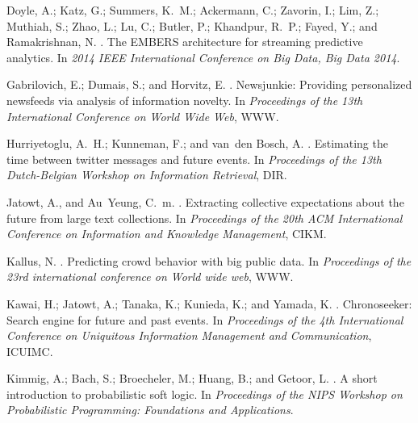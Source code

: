\documentclass[letterpaper]{article}
\begin{document}
\begin{thebibliography}{}
Doyle, A.; Katz, G.; Summers, K.~M.; Ackermann, C.; Zavorin, I.; Lim, Z.;
  Muthiah, S.; Zhao, L.; Lu, C.; Butler, P.; Khandpur, R.~P.; Fayed, Y.; and
  Ramakrishnan, N.
.
\newblock The {EMBERS} architecture for streaming predictive analytics.
\newblock In {\em 2014 {IEEE} International Conference on Big Data, Big Data
  2014}.

Gabrilovich, E.; Dumais, S.; and Horvitz, E.
.
\newblock Newsjunkie: Providing personalized newsfeeds via analysis of
  information novelty.
\newblock In {\em Proceedings of the 13th International Conference on World
  Wide Web}, WWW.

Hurriyetoglu, A.~H.; Kunneman, F.; and van~den Bosch, A.
.
\newblock Estimating the time between twitter messages and future events.
\newblock In {\em Proceedings of the 13th Dutch-Belgian Workshop on Information
  Retrieval}, DIR.

Jatowt, A., and Au~Yeung, C.~m.
.
\newblock Extracting collective expectations about the future from large text
  collections.
\newblock In {\em Proceedings of the 20th ACM International Conference on
  Information and Knowledge Management}, CIKM.

Kallus, N.
.
\newblock Predicting crowd behavior with big public data.
\newblock In {\em Proceedings of the 23rd international conference on World
  wide web}, WWW.

Kawai, H.; Jatowt, A.; Tanaka, K.; Kunieda, K.; and Yamada, K.
.
\newblock Chronoseeker: Search engine for future and past events.
\newblock In {\em Proceedings of the 4th International Conference on Uniquitous
  Information Management and Communication}, ICUIMC.

Kimmig, A.; Bach, S.; Broecheler, M.; Huang, B.; and Getoor, L.
.
\newblock A short introduction to probabilistic soft logic.
\newblock In {\em Proceedings of the NIPS Workshop on Probabilistic
  Programming: Foundations and Applications}.


\end{thebibliography}
\end{document}
